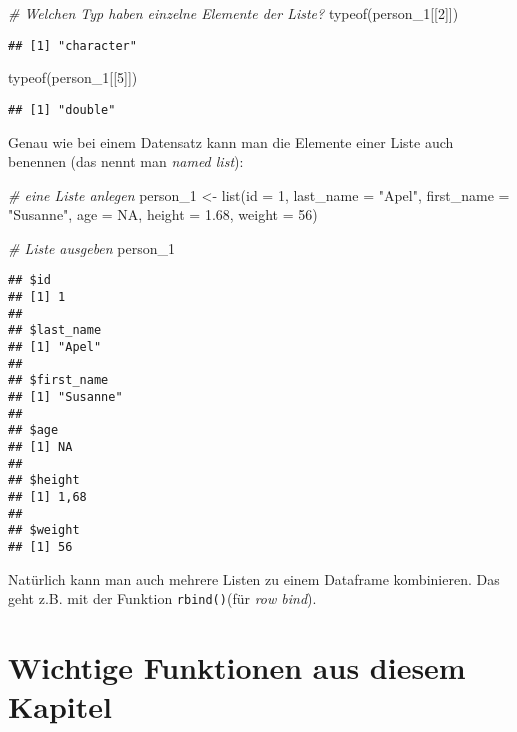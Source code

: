 \documentclass[
]{book}
\newenvironment{Shaded}{\begin{snugshade}}{\end{snugshade}}
\newcommand{\AttributeTok}[1]{\textcolor[rgb]{0.77,0.63,0.00}{#1}}
\newcommand{\CommentTok}[1]{\textcolor[rgb]{0.56,0.35,0.01}{\textit{#1}}}
\newcommand{\ConstantTok}[1]{\textcolor[rgb]{0.00,0.00,0.00}{#1}}
\newcommand{\DecValTok}[1]{\textcolor[rgb]{0.00,0.00,0.81}{#1}}
\newcommand{\FloatTok}[1]{\textcolor[rgb]{0.00,0.00,0.81}{#1}}
\newcommand{\FunctionTok}[1]{\textcolor[rgb]{0.00,0.00,0.00}{#1}}
\newcommand{\NormalTok}[1]{#1}
\newcommand{\OtherTok}[1]{\textcolor[rgb]{0.56,0.35,0.01}{#1}}
\newcommand{\StringTok}[1]{\textcolor[rgb]{0.31,0.60,0.02}{#1}}
\begin{document}
\begin{Shaded}
\begin{Highlighting}[]
\CommentTok{\# Welchen Typ haben einzelne Elemente der Liste?}
\FunctionTok{typeof}\NormalTok{(person\_1[[}\DecValTok{2}\NormalTok{]])}
\end{Highlighting}
\end{Shaded}

\begin{verbatim}
## [1] "character"
\end{verbatim}

\begin{Shaded}
\begin{Highlighting}[]
\FunctionTok{typeof}\NormalTok{(person\_1[[}\DecValTok{5}\NormalTok{]])}
\end{Highlighting}
\end{Shaded}

\begin{verbatim}
## [1] "double"
\end{verbatim}

Genau wie bei einem Datensatz kann man die Elemente einer Liste auch benennen (das nennt man \emph{named list}):

\begin{Shaded}
\begin{Highlighting}[]
\CommentTok{\# eine Liste anlegen}
\NormalTok{person\_1 }\OtherTok{\textless{}{-}} \FunctionTok{list}\NormalTok{(}\AttributeTok{id =} \DecValTok{1}\NormalTok{, }\AttributeTok{last\_name =} \StringTok{"Apel"}\NormalTok{, }\AttributeTok{first\_name =} \StringTok{"Susanne"}\NormalTok{, }\AttributeTok{age =} \ConstantTok{NA}\NormalTok{, }\AttributeTok{height =} \FloatTok{1.68}\NormalTok{, }\AttributeTok{weight =} \DecValTok{56}\NormalTok{)}

\CommentTok{\# Liste ausgeben}
\NormalTok{person\_1}
\end{Highlighting}
\end{Shaded}

\begin{verbatim}
## $id
## [1] 1
## 
## $last_name
## [1] "Apel"
## 
## $first_name
## [1] "Susanne"
## 
## $age
## [1] NA
## 
## $height
## [1] 1,68
## 
## $weight
## [1] 56
\end{verbatim}

Natürlich kann man auch mehrere Listen zu einem Dataframe kombinieren. Das geht z.B. mit der Funktion \texttt{rbind()}(für \emph{row bind}).

\hypertarget{wichtige-funktionen-aus-diesem-kapitel}{%
\section*{Wichtige Funktionen aus diesem Kapitel}\label{wichtige-funktionen-aus-diesem-kapitel}}
\end{document}
